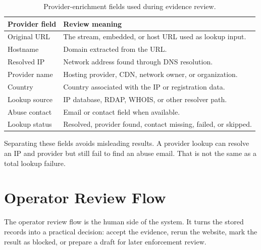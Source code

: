 \begin{table}[!htbp]
\centering
\begin{tabularx}{\textwidth}{Q{3.7cm}Y}
\toprule
{}
Provider field & Review meaning \\
\midrule
Original URL & The stream, embedded, or host URL used as lookup input. \\
Hostname & Domain extracted from the URL. \\
Resolved IP & Network address found through DNS resolution. \\
Provider name & Hosting provider, CDN, network owner, or organization. \\
Country & Country associated with the IP or registration data. \\
Lookup source & IP database, RDAP, WHOIS, or other resolver path. \\
Abuse contact & Email or contact field when available. \\
Lookup status & Resolved, provider found, contact missing, failed, or skipped. \\
\bottomrule
\end{tabularx}
\caption{Provider-enrichment fields used during evidence review.}
\label{tab:provider-review-fields}
\end{table}

Separating these fields avoids misleading results. A provider lookup can resolve
an IP and provider but still fail to find an abuse email. That is not the same
as a total lookup failure.

\section{Operator Review Flow}

The operator review flow is the human side of the system. It turns the stored
records into a practical decision: accept the evidence, rerun the website, mark
the result as blocked, or prepare a draft for later enforcement review.

